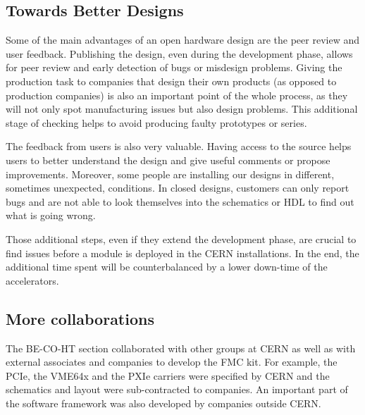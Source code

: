 \documentclass{JAC2003}
\begin{document}
\subsection{Towards Better Designs}
Some of the main advantages of an open hardware design are the peer review and user feedback.
Publishing the design, even during the development phase, allows for peer review and early detection of bugs or misdesign problems.
Giving the production task to companies that design their own products (as opposed to production companies) is also an important point of the whole process, as they will not only spot manufacturing issues but also design problems.
This additional stage of checking helps to avoid producing faulty prototypes or series.

The feedback from users is also very valuable.
Having access to the source helps users to better understand the design and give useful comments or propose improvements.
Moreover, some people are installing our designs in different, sometimes unexpected, conditions.
In closed designs, customers can only report bugs and are not able to look themselves into the schematics or HDL to find out what is going wrong.

Those additional steps, even if they extend the development phase, are crucial to find issues before a module is deployed in the CERN installations.
In the end, the additional time spent will be counterbalanced by a lower down-time of the accelerators.



\subsection{More collaborations}
The BE-CO-HT section collaborated with other groups at CERN as well as with external associates and companies to develop the FMC kit.
For example, the PCIe, the VME64x and the PXIe carriers were specified by CERN and the schematics and layout were sub-contracted to companies.
An important part of the software framework was also developed by companies outside CERN.
\end{document}

